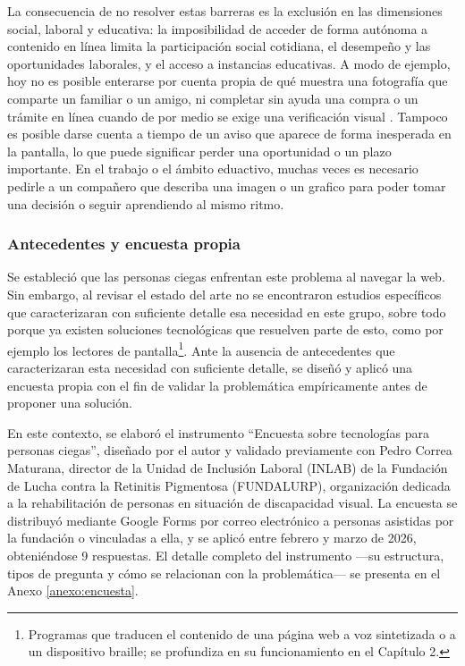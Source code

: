 La consecuencia de no resolver estas barreras es la exclusión en las dimensiones social, laboral y educativa: la imposibilidad de acceder de forma autónoma a contenido en línea limita la participación social cotidiana, el desempeño y las oportunidades laborales, y el acceso a instancias educativas. A modo de ejemplo, hoy no es posible enterarse por cuenta propia de qué muestra una fotografía que comparte un familiar o un amigo, ni completar sin ayuda una compra o un trámite en línea cuando de por medio se exige una verificación visual \cite{webaim2024screenreadersurvey10}. Tampoco es posible darse cuenta a tiempo de un aviso que aparece de forma inesperada en la pantalla, lo que puede significar perder una oportunidad o un plazo importante. En el trabajo o el ámbito eduactivo, muchas veces es necesario pedirle a un compañero que describa una imagen o un grafico para poder tomar una decisión o seguir aprendiendo al mismo ritmo.

\subsubsection{Antecedentes y encuesta propia}

Se estableció que las personas ciegas enfrentan este problema al navegar la web. Sin embargo, al revisar el estado del arte no se encontraron estudios específicos que caracterizaran con suficiente detalle esa necesidad en este grupo, sobre todo porque ya existen soluciones tecnológicas que resuelven parte de esto, como por ejemplo los lectores de pantalla\footnote{Programas que traducen el contenido de una página web a voz sintetizada o a un dispositivo braille; se profundiza en su funcionamiento en el Capítulo 2.}. Ante la ausencia de antecedentes que caracterizaran esta necesidad con suficiente detalle, se diseñó y aplicó una encuesta propia con el fin de validar la problemática empíricamente antes de proponer una solución.

En este contexto, se elaboró el instrumento ``Encuesta sobre tecnologías para personas ciegas'', diseñado por el autor y validado previamente con Pedro Correa Maturana, director de la Unidad de Inclusión Laboral (INLAB) de la Fundación de Lucha contra la Retinitis Pigmentosa (FUNDALURP), organización dedicada a la rehabilitación de personas en situación de discapacidad visual. La encuesta se distribuyó mediante Google Forms por correo electrónico a personas asistidas por la fundación o vinculadas a ella, y se aplicó entre febrero y marzo de 2026, obteniéndose 9 respuestas. El detalle completo del instrumento —su estructura, tipos de pregunta y cómo se relacionan con la problemática— se presenta en el Anexo \ref{anexo:encuesta}.

